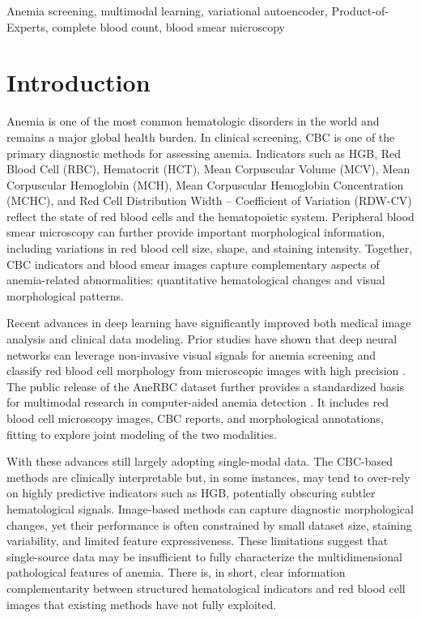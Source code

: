 \documentclass[conference]{IEEEtran}
\begin{document}
\begin{IEEEkeywords}
Anemia screening, multimodal learning, variational autoencoder, Product-of-Experts, complete blood count, blood smear microscopy
\end{IEEEkeywords}

\section{Introduction}

Anemia is one of the most common hematologic disorders in the world and remains a major global health burden. In clinical screening, CBC is one of the primary diagnostic methods for assessing anemia. Indicators such as HGB, Red Blood Cell (RBC), Hematocrit (HCT), Mean Corpuscular Volume (MCV), Mean Corpuscular Hemoglobin (MCH), Mean Corpuscular Hemoglobin Concentration (MCHC), and Red Cell Distribution Width -- Coefficient of Variation (RDW-CV) reflect the state of red blood cells and the hematopoietic system. Peripheral blood smear microscopy can further provide important morphological information, including variations in red blood cell size, shape, and staining intensity. Together, CBC indicators and blood smear images capture complementary aspects of anemia-related abnormalities: quantitative hematological changes and visual morphological patterns.

Recent advances in deep learning have significantly improved both medical image analysis and clinical data modeling. Prior studies have shown that deep neural networks can leverage non-invasive visual signals for anemia screening and classify red blood cell morphology from microscopic images with high precision \cite{ref1,ref2}. The public release of the AneRBC dataset further provides a standardized basis for multimodal research in computer-aided anemia detection \cite{ref3}. It includes red blood cell microscopy images, CBC reports, and morphological annotations, fitting to explore joint modeling of the two modalities.

With these advances still largely adopting single-modal data. The CBC-based methods are clinically interpretable but, in some instances, may tend to over-rely on highly predictive indicators such as HGB, potentially obscuring subtler hematological signals. Image-based methods can capture diagnostic morphological changes, yet their performance is often constrained by small dataset size, staining variability, and limited feature expressiveness. These limitations suggest that single-source data may be insufficient to fully characterize the multidimensional pathological features of anemia. There is, in short, clear information complementarity between structured hematological indicators and red blood cell images that existing methods have not fully exploited.
\end{document}
